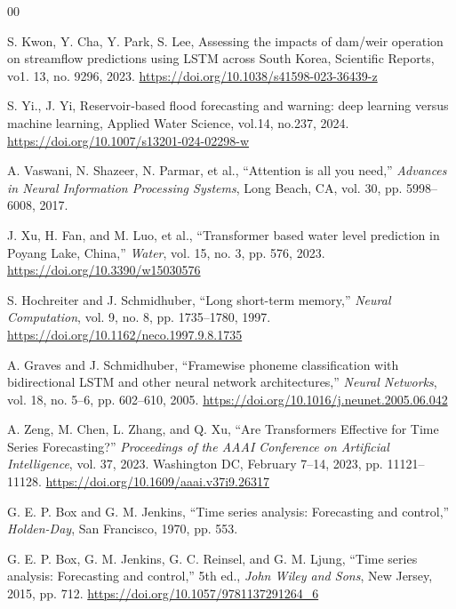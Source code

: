 \documentclass[a4paper,twoside,flushend, 10pt]{article}
\begin{document}
\begin{thebibliography}{00}

S. Kwon, Y. Cha, Y. Park, S. Lee, Assessing the impacts of dam/weir operation on streamflow predictions using LSTM across South Korea, Scientific Reports, vo1. 13, no. 9296, 2023. \href{https://doi.org/10.1038/s41598-023-36439-z}{https://doi.org/10.1038/s41598-023-36439-z}

S. Yi., J. Yi, Reservoir‑based flood forecasting and warning: deep learning versus machine learning, Applied Water Science, vol.14, no.237, 2024. \href{https://doi.org/10.1007/s13201-024-02298-w}{https://doi.org/10.1007/s13201-024-02298-w}

A. Vaswani, N. Shazeer, N. Parmar, et al.,
``Attention is all you need,'' \emph{Advances in Neural Information Processing Systems}, Long Beach, CA, vol. 30, pp. 5998--6008, 2017.

J. Xu, H. Fan, and M. Luo, et al.,
``Transformer based water level prediction in Poyang Lake, China,'' \emph{Water}, vol. 15, no. 3, pp. 576, 2023. \href{https://doi.org/10.3390/w15030576}{https://doi.org/10.3390/w15030576}

S. Hochreiter and J. Schmidhuber,
``Long short-term memory,'' \emph{Neural Computation}, vol. 9, no. 8, pp. 1735--1780, 1997. \href{https://doi.org/10.1162/neco.1997.9.8.1735}{https://doi.org/10.1162/neco.1997.9.8.1735}

A. Graves and J. Schmidhuber,
``Framewise phoneme classification with bidirectional LSTM and other neural network architectures,'' \emph{Neural Networks}, vol. 18, no. 5--6, pp. 602--610, 2005. \href{https://doi.org/10.1016/j.neunet.2005.06.042}{https://doi.org/10.1016/j.neunet.2005.06.042}

A. Zeng, M. Chen, L. Zhang, and Q. Xu,
``Are Transformers Effective for Time Series Forecasting?'' \emph{Proceedings of the AAAI Conference on Artificial Intelligence}, vol. 37, 2023. Washington DC, February 7–14, 2023, pp. 11121--11128. \href{https://doi.org/10.1609/aaai.v37i9.26317}{https://doi.org/10.1609/aaai.v37i9.26317}

G. E. P. Box and G. M. Jenkins,
``Time series analysis: Forecasting and control,'' \emph{Holden-Day}, San Francisco, 1970, pp. 553.

G. E. P. Box, G. M. Jenkins, G. C. Reinsel, and G. M. Ljung,
``Time series analysis: Forecasting and control,'' 5th ed., \emph{John Wiley and Sons}, New Jersey, 2015, pp. 712. \href{ https://doi.org/10.1057/9781137291264\_6}{ https://doi.org/10.1057/9781137291264\_6}


\end{thebibliography}
\end{document}
